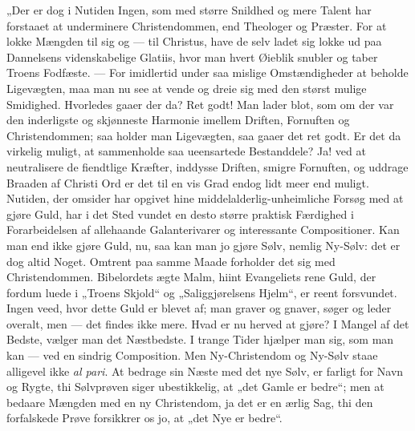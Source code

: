 \documentclass[12pt,a4paper]{book}
\begin{document}
„Der er dog i Nutiden Ingen, som med større Snildhed og mere Talent har forstaaet at
underminere Christendommen, end Theologer og Præster. For at lokke Mængden til sig og
--- til Christus, have de selv ladet sig lokke ud paa Dannelsens videnskabelige
Glatiis, hvor man hvert Øieblik snubler og taber Troens Fodfæste. --- For imidlertid
under saa mislige Omstændigheder at beholde Ligevægten, maa man nu see at vende og
dreie sig med den størst mulige Smidighed. Hvorledes gaaer der da? Ret godt! Man lader
blot, som om der var den inderligste og skjønneste Harmonie imellem Driften, Fornuften
og Christendommen; saa holder man Ligevægten, saa gaaer det ret godt. Er det da
virkelig muligt, at sammenholde saa ueensartede Bestanddele? Ja! ved at neutralisere de
fiendtlige Kræfter, inddysse Driften, smigre Fornuften, og uddrage Braaden af Christi
Ord er det til en vis Grad endog lidt meer end muligt. Nutiden, der omsider har
opgivet hine middelalderlig-unheimliche Forsøg med at gjøre Guld, har i det Sted vundet
en desto større praktisk Færdighed i Forarbeidelsen af allehaande Galanterivarer og
interessante Compositioner. Kan man end ikke gjøre Guld, nu, saa kan man jo gjøre Sølv,
nemlig Ny-Sølv: det er dog altid Noget. Omtrent paa samme Maade forholder det sig med
Christendommen. Bibelordets ægte Malm, hiint Evangeliets rene Guld, der fordum luede i
„Troens Skjold“ og „Saliggjørelsens Hjelm“, er reent forsvundet. Ingen veed, hvor dette
Guld er blevet af; man graver og gnaver, søger og leder overalt, men --- det findes
ikke mere. Hvad er nu herved at gjøre? I Mangel af det Bedste, vælger man det
Næstbedste. I trange Tider hjælper man sig, som man kan --- ved en sindrig Composition.
Men Ny-Christendom og Ny-Sølv staae alligevel ikke \textit{al pari}. At bedrage sin
Næste med det nye Sølv, er farligt for Navn og Rygte, thi Sølvprøven siger ubestikkelig,
at „det Gamle er bedre“; men at bedaare Mængden med en ny Christendom, ja det er en
ærlig Sag, thi den forfalskede Prøve forsikkrer os jo, at „det Nye er bedre“.
\end{document}
